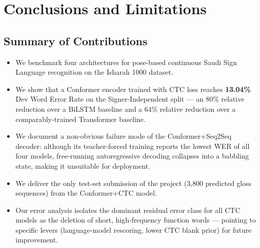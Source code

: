 \documentclass[11pt,a4paper]{article}
\newcommand{\bestwer}{\textbf{13.04\%}}
\begin{document}
\section{Conclusions and Limitations}

\subsection{Summary of Contributions}
\begin{itemize}
  \item We benchmark four architectures for pose-based continuous Saudi Sign Language recognition on the Isharah 1000 dataset.
  \item We show that a Conformer encoder trained with CTC loss reaches \bestwer{} Dev Word Error Rate on the Signer-Independent split --- an 80\% relative reduction over a BiLSTM baseline and a 64\% relative reduction over a comparably-trained Transformer baseline.
  \item We document a non-obvious failure mode of the Conformer+Seq2Seq decoder: although its teacher-forced training reports the lowest WER of all four models, free-running autoregressive decoding collapses into a babbling state, making it unsuitable for deployment.
  \item We deliver the only test-set submission of the project (3{,}800 predicted gloss sequences) from the Conformer+CTC model.
  \item Our error analysis isolates the dominant residual error class for all CTC models as the deletion of short, high-frequency function words --- pointing to specific levers (language-model rescoring, lower CTC blank prior) for future improvement.
\end{itemize}
\end{document}
